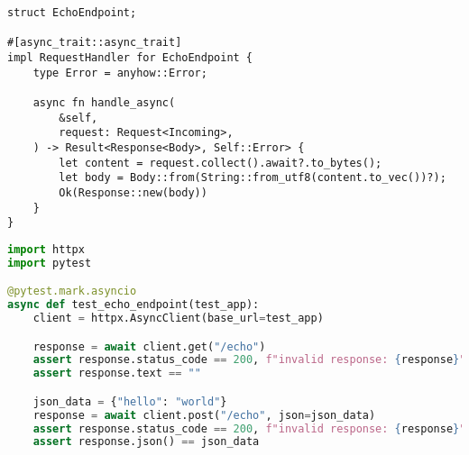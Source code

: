 \documentclass[times,numbers=noenddot]{itmo-student-thesis}
\begin{document}
\begin{lstlisting}[float=!h,caption={Бизнес-логика тестового приложения},label={lst3}]
struct EchoEndpoint;

#[async_trait::async_trait]
impl RequestHandler for EchoEndpoint {
    type Error = anyhow::Error;

    async fn handle_async(
        &self,
        request: Request<Incoming>,
    ) -> Result<Response<Body>, Self::Error> {
        let content = request.collect().await?.to_bytes();
        let body = Body::from(String::from_utf8(content.to_vec())?);
        Ok(Response::new(body))
    }
}
\end{lstlisting}

\begin{lstlisting}[float=!h,caption={Тест первичной реализации},label={lst4},language=python]
import httpx
import pytest

@pytest.mark.asyncio
async def test_echo_endpoint(test_app):
    client = httpx.AsyncClient(base_url=test_app)

    response = await client.get("/echo")
    assert response.status_code == 200, f"invalid response: {response}"
    assert response.text == ""

    json_data = {"hello": "world"}
    response = await client.post("/echo", json=json_data)
    assert response.status_code == 200, f"invalid response: {response}"
    assert response.json() == json_data
\end{lstlisting}
\end{document}
